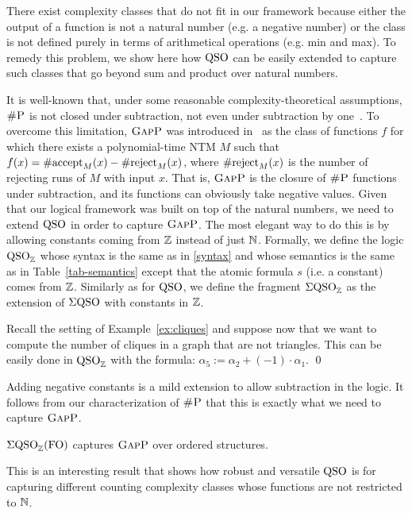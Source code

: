 
There exist complexity classes that do not fit in our framework because either the output of a function is not a natural number (e.g. a negative number) or the class is not defined purely in terms of arithmetical operations (e.g. min and max).
To remedy this problem, we show here how ${\rm QSO}$ can be easily extended  to capture such classes that go beyond sum and product over natural numbers. 

It is well-known that, under some reasonable complexity-theoretical assumptions, $\text{\sc \#P}$ is not closed under subtraction, not even under subtraction by one~\cite{OH93}.
To overcome this limitation, $\text{\sc GapP}$ was introduced in~\cite{FFK94} as the class of functions $f$ for which there exists a polynomial-time NTM $M$ such that $f(x) = \text{\rm \#accept}_M(x) - \text{\rm \#reject}_M(x)$, where  $\text{\rm \#reject}_M(x)$ is the number of rejecting runs of $M$ with input $x$.
That is, $\text{\sc GapP}$ is the closure of $\text{\sc \#P}$ functions under subtraction, and its functions can obviously take negative values.
Given that our logical framework was built on top of the natural numbers, we need to extend ${\rm QSO}$ in order to capture $\text{\sc GapP}$. 
The most elegant way to do this is by allowing constants coming from $\mathbb{Z}$ instead of just $\mathbb{N}$. 
Formally, we define the logic ${\rm QSO}_{\mathbb{Z}}$ whose syntax is the same as in \eqref{syntax} and whose semantics is the same as in Table~\ref{tab-semantics} except that the atomic formula $s$ (i.e. a constant) comes from $\mathbb{Z}$.  
Similarly as for ${\rm QSO}$, we define the fragment $\Sigma{\rm QSO}_{\mathbb{Z}}$ as the extension of $\Sigma{\rm QSO}$ with constants in $\mathbb{Z}$.
\begin{exa}
	Recall the setting of Example~\ref{ex:cliques} and suppose now that we want to compute the number of cliques in a graph that are not triangles. This can be easily done in ${\rm QSO}_{\mathbb{Z}}$ with the formula:
	$
	\alpha_5 :=	\alpha_2 + (-1) \cdot \alpha_1. 
	$ \qed
\end{exa}
Adding negative constants is a mild extension to allow subtraction in the logic. 
It follows from our characterization of $\text{\sc \#P}$ that this is exactly what we need to capture  $\text{\sc GapP}$.
\begin{cor} \label{prop:capture-gapp}
	$\Sigma{\rm QSO}_{\mathbb{Z}}({\rm FO})$ captures $\text{\sc GapP}$ over ordered structures.
\end{cor}
This is an interesting result that shows how robust and versatile ${\rm QSO}$ is for capturing different counting complexity classes whose functions are not restricted to $\mathbb{N}$.

